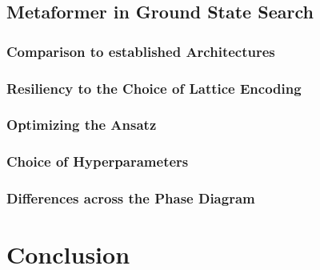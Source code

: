 \documentclass[
headings=optiontohead,              %
12pt,                               %
DIV=13,                             %
twoside=false,                      %
open=right,                         %
BCOR=10mm,                          %
toc=bibliographynumbered            %
]{scrreport}
\begin{document}
    \section{Metaformer in Ground State Search}
    \label{sec:experiments-ground-state-search}
    
        \subsection{Comparison to established Architectures}
        \label{sec:experiments-comparisontoestablished}
        
        \FloatBarrier
        \subsection{Resiliency to the Choice of Lattice Encoding}
        \label{sec:experiments-resiliencylatticeencoding}
        
        \FloatBarrier
        \subsection{Optimizing the Ansatz}
        \label{sec:experiments-optimizingtheansatz}
        
        \FloatBarrier
        \subsection{Choice of Hyperparameters}
        \label{sec:experiments-hyperparameters}
        
        \FloatBarrier
        \subsection{Differences across the Phase Diagram}
        \label{sec:experiments-phasecriticalpoint}
        
        \FloatBarrier

\chapter{Conclusion}
\label{sec:conclusion}



\end{document}
